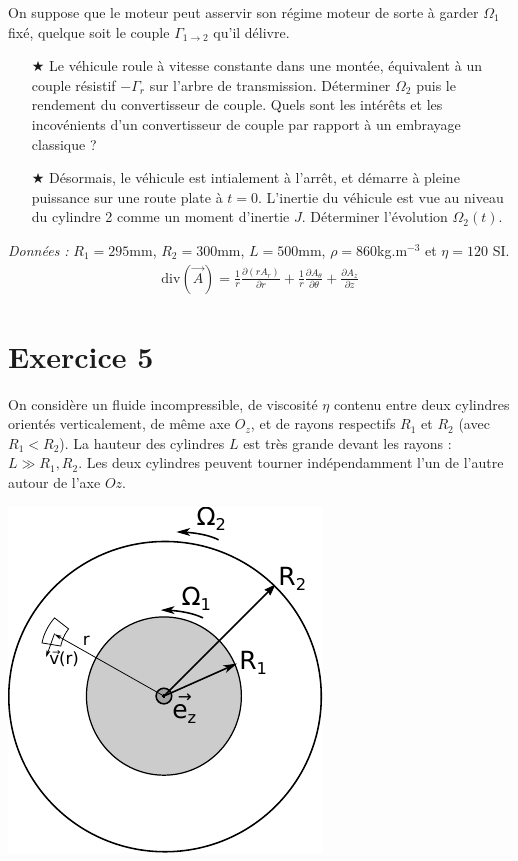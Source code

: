 \documentclass{report}
\begin{document}
On suppose que le moteur peut asservir son régime moteur de sorte à garder $\Omega_1$ fixé, quelque soit le couple $\Gamma_{1\rightarrow2}$ qu'il délivre.

\begin{itemize}
	
	\item[$\bigstar$] Le véhicule roule à vitesse constante dans une montée, équivalent à un couple résistif $-\Gamma_r$ sur l'arbre de transmission. Déterminer $\Omega_2$ puis le rendement du convertisseur de couple. Quels sont les intérêts et les incovénients d'un convertisseur de couple par rapport à un embrayage classique ?
	
	\item[$\bigstar$]  Désormais, le véhicule est intialement à l'arrêt, et démarre à pleine puissance sur une route plate à $t=0$. L'inertie du véhicule est vue au niveau du cylindre 2 comme un moment d'inertie $J$. Déterminer l'évolution $\Omega_2(t)$. 
		
\end{itemize}

\textit{Données :} $R_1=295$mm, $R_2=300$mm, $L=500$mm, $\rho=860$kg.m$^{-3}$ et $\eta=120$ SI. 
\begin{align*}
	\mathrm{div}(\vec{A}) =
\frac{1}{r}\frac{\partial (r A_r)}{\partial r} + \frac{1}{r}\frac{\partial A_\theta}{\partial \theta} + \frac{\partial A_z}{\partial z}
\end{align*}	

\newpage

\section*{Exercice 5}

On considère un fluide incompressible, de viscosité $\eta$ contenu entre deux cylindres orientés verticalement, de même axe $O_z$, et de rayons respectifs $R_1$ et $R_2$ (avec $R_1<R_2$). La hauteur des cylindres $L$ est très grande devant les rayons : $L\gg R_1, R_2$. Les deux cylindres peuvent tourner indépendamment l'un de l'autre autour de l'axe $Oz$. 

\begin{center}
	\includegraphics[scale=0.8]{meca_flu3.pdf}
\end{center}
\end{document}
